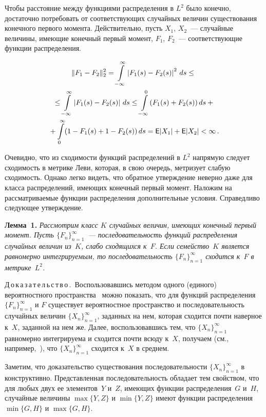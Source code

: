 \begin{multicols}{2}
{}

Чтобы расстояние между функциями распределения в $L^2$ было конечно,
достаточно потребовать от соответствующих случайных величин
существования конечного первого момента. Действительно, пусть $X_1$,
$X_2$~--- случайные величины, имеющие конечный первый момент, $F_1$,
$F_2$~--- соответствующие функции распределения.

\noindent
\begin{multline*}
\|F_1 - F_2 \|^2_{2} =
\int\limits_{-\infty}^{\infty} \left\vert F_1(s) - F_2(s)\right\vert^2\, ds 
\le {}\\
{}\le \int\limits_{-\infty}^{\infty} \left\vert F_1(s) - F_2(s)\right\vert\, ds \le 
\int\limits_{-\infty}^{0} (F_1(s) + F_2(s)) \, ds +{}\\
{}+
\int\limits_{0}^{\infty}( 1- F_1(s) + 1 - F_2(s)  )\,ds  = 
{\sf E}|X_1| + {\sf E}|X_2| < \infty\,.
\end{multline*}

Очевидно, что из сходимости функций распределений в $L^2$ напрямую
следует сходимость в метрике Леви, которая, в свою очередь,
метризует слабую сходимость. Однако легко видеть, что обратное
утверждение неверно даже для класса распределений, имеющих конечный
первый момент. Наложим на рассматриваемые функции распределения
дополнительные условия. Справедливо следующее утверждение.

\smallskip

\noindent
\textbf{Лемма~1.}
\textit{Рассмотрим класс $K$ случайных величин, имеющих конечный первый
момент. Пусть $\{F_n\}_{n=1}^\infty$~--- последовательность функций
распределения случайных величин из~$K$, слабо сходящихся к~$F$. Если
семейство~$K$ является равномерно интегрируемым, то
последовательность $\{F_n\}_{n=1}^\infty$ сходится к~$F$ в метрике~$L^2$.}

\smallskip

\noindent
Д\,о\,к\,а\,з\,а\,т\,е\,л\,ь\,с\,т\,в\,о\,.\ Воспользовавшись 
методом одного (единого) вероятностного
пространства~\cite{Skorohod1956}  можно показать, что для функций
распределения $\{F_n\}_{n=1}^\infty$  и $F$ существует вероятностное
пространство и последовательность случайных величин
$\{X_n\}_{n=1}^\infty$, заданных на нем, которая сходится почти
наверное к~$X$, заданной на нем же. Далее, воспользовавшись тем, что
$\{X_n\}_{n=1}^\infty$ равномерно интегрируема и сходится почти
всюду к~$X$, получаем (см., например,~\cite{shirVer}), что
$\{X_n\}_{n=1}^\infty$ сходится к~$X$ в среднем.

Заметим, что доказательство существования последовательности
$\{X_n\}_{n=1}^\infty$ в~\cite{shirVer} конструктивно.
Представленная последовательность  обладает тем свойством, что для
любых двух ее элементов~$Y$ и~$Z$, имеющих функции распределения~$G$
и~$H$, случайные величины $\max\{Y,Z\}$ и $\min\{Y,Z\}$ имеют
функции распределения $\min\{G,H\}$ и $\max\{G,H\}$.


\end{multicols}
